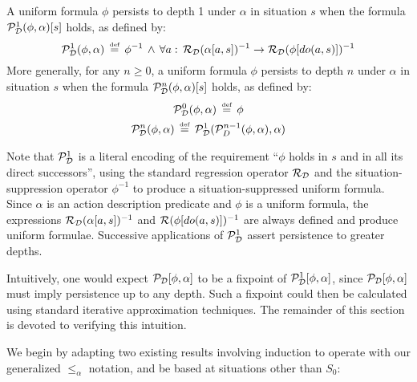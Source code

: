 \begin{defnL}
 A uniform formula $\phi$ persists
to depth 1 under $\alpha$ in situation $s$ when the formula $\mathcal{P}_{\mathcal{D}}^{1}(\phi,\alpha)[s]$
holds, as defined by:\label{def:persists-depth-n}\[
\mathcal{P}_{\mathcal{D}}^{1}(\phi,\alpha)\,\stackrel{\mbox{\tiny def}}{=}\,\phi^{-1}\,\wedge\,\forall a:\,\mathcal{R}_{\mathcal{D}}(\alpha[a,s])^{-1}\rightarrow\mathcal{R}_{\mathcal{D}}(\phi[do(a,s)])^{-1}\]
 More generally, for any $n\geq0$, a uniform formula $\phi$ persists
to depth $n$ under $\alpha$ in situation $s$ when the formula $\mathcal{P}_{\mathcal{D}}^{n}(\phi,\alpha)[s]$
holds, as defined by:\begin{gather*}
\mathcal{P}_{\mathcal{D}}^{0}(\phi,\alpha)\,\stackrel{\mbox{\tiny def}}{=}\,\phi\\
\mathcal{P}_{\mathcal{D}}^{n}(\phi,\alpha)\,\stackrel{\mbox{\tiny def}}{=}\,\mathcal{P}_{\mathcal{D}}^{1}(\mathcal{P}_{D}^{n-1}(\phi,\alpha),\alpha)\end{gather*}

\end{defnL}
Note that $\mathcal{P}_{\mathcal{D}}^{1}$ is a literal encoding of
the requirement {}``$\phi$ holds in $s$ and in all its direct successors'',
using the standard regression operator $\mathcal{R}_{\mathcal{D}}$ and the situation-suppression
operator $\phi^{-1}$ to produce a situation-suppressed uniform formula.
Since $\alpha$ is an action description predicate and $\phi$ is
a uniform formula, the expressions $\mathcal{R}_{\mathcal{D}}(\alpha[a,s])^{-1}$
and $\mathcal{R}(\phi[do(a,s)])^{-1}$ are always defined and produce uniform
formulae. Successive applications of $\mathcal{P}_{\mathcal{D}}^{1}$
assert persistence to greater depths.

Intuitively, one would expect $\mathcal{P}_{\mathcal{D}}[\phi,\alpha]$
to be a fixpoint of $\mathcal{P}_{\mathcal{D}}^{1}[\phi,\alpha]$,
since $\mathcal{P}_{\mathcal{D}}[\phi,\alpha]$ must imply persistence
up to any depth. Such a fixpoint could then be calculated using standard
iterative approximation techniques. The remainder of this section
is devoted to verifying this intuition.

We begin by adapting two existing results involving induction to operate
with our generalized $\leq_{\alpha}$ notation, and be based at situations
other than $S_{0}$:

